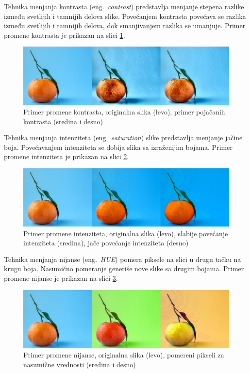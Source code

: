 \documentclass[12pt,oneside]{memoir}
\begin{document}
Tehnika menjanja kontrasta (eng.~\textit{contrast}) predstavlja menjanje stepena razlike između svetlijih i tamnijih delova slike. Povećanjem kontrasta povećava se razlika između svetlijih i tamnijih delova, dok smanjivanjem razlika se umanjuje. Primer promene kontrasta je prikazan na slici \ref{fig:section3_contrast}.

\begin{figure}[ht]
    \centering
    \includegraphics[width=1\textwidth]{matfmaster/glava3/contrast.jpg}
    \caption{Primer promene kontrasta, originalna slika (levo), primer pojačanih kontrasta (sredina i desno) \cite{unsplashOrange}} 
    \label{fig:section3_contrast}
\end{figure}


Tehnika menjanja intenziteta (eng.~\textit{saturation}) slike predstavlja menjanje jačine boja. Povećavanjem intenziteta se dobija slika sa izraženijim bojama. Primer promene intenziteta je prikazan na slici \ref{fig:section3_saturation}.

\begin{figure}[ht]
    \centering
    \includegraphics[width=1\textwidth]{matfmaster/glava3/saturation.jpg}
    \caption{Primer promene intenziteta, originalna slika (levo), slabije povećanje intenziteta (sredina), jače povećanje intenziteta (desno) \cite{unsplashOrange}} 
    \label{fig:section3_saturation}
\end{figure}

Tehnika menjanja nijanse (eng.~\textit{HUE}) pomera piksele na slici u drugu tačku na krugu boja. Nasumično pomeranje generiše nove slike sa drugim bojama. Primer promene nijanse je prikazan na slici \ref{fig:section3_hue}.


\begin{figure}[ht]
    \centering
    \includegraphics[width=1\textwidth]{matfmaster/glava3/hue.jpg}
    \caption{Primer promene nijanse, originalna slika (levo), pomereni pikseli za nasumične vrednosti (sredina i desno) \cite{unsplashOrange}} 
    \label{fig:section3_hue}
\end{figure}
\end{document}
